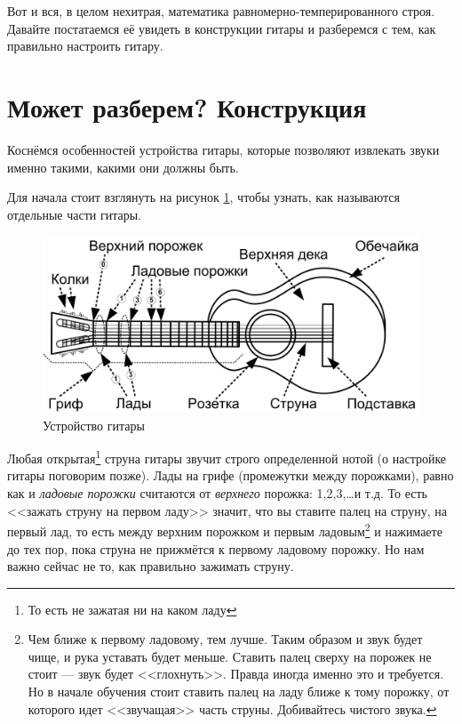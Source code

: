 Вот и вся, в целом нехитрая, математика равномерно-темперированного строя. Давайте постатаемся её увидеть в конструкции гитары и разберемся с тем, как правильно настроить гитару.


\section{Может разберем? Конструкция}
\label{ch:guitar:construction}

Коснёмся особенностей устройства гитары, которые позволяют извлекать звуки именно такими, какими они должны быть. 

Для начала стоит взглянуть на рисунок \ref{fig:guitar:construction}, чтобы узнать, как называются отдельные части гитары.

\begin{figure}[!ht]
    \centering
    \includegraphics{fig/guitar-construction} 
    \caption{Устройство гитары}\label{fig:guitar:construction}
\end{figure} 

Любая открытая\footnote{То есть не зажатая ни на каком ладу} струна гитары звучит строго определенной нотой (о настройке гитары поговорим позже). Лады на грифе (промежутки между порожками), равно как и \emph{ладовые порожки} считаются от \emph{верхнего} порожка: 1,2,3,\ldots и т.д. То есть <<зажать струну на первом ладу>> значит, что вы ставите палец на струну, на первый лад, то есть между верхним порожком и первым ладовым\footnote{Чем ближе к первому ладовому, тем лучше. Таким образом и звук будет чище, и рука уставать будет меньше. Ставить палец сверху на порожек не стоит --- звук будет <<глохнуть>>. Правда иногда именно это и требуется. Но в начале обучения стоит ставить палец на ладу ближе к тому порожку, от которого идет <<звучащая>> часть струны. Добивайтесь чистого звука.} и нажимаете до тех пор, пока струна не прижмётся к первому ладовому порожку. Но нам важно сейчас не то, как правильно зажимать струну. 


